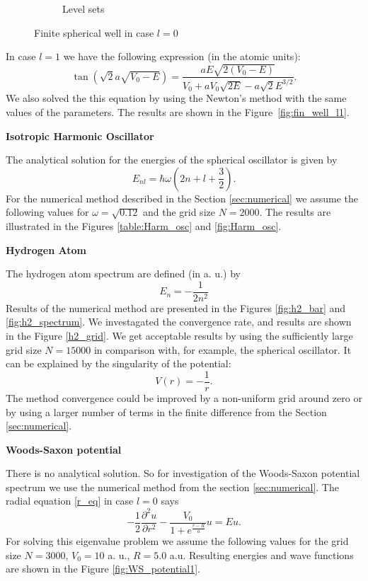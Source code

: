 \documentclass[a4paper, 11pt]{article}
\begin{document}
\begin{figure}[h!]
\begin{subfigure}{.5\textwidth}
  \caption{Level sets}
  \label{fig:wave_func}
\end{subfigure}
\caption{Finite spherical well in case $l=0$}
\label{fig:WS_potential}
\end{figure}

In case $l=1$ we have the following expression (in the atomic units):
$$\tan(\sqrt{2} a \sqrt{V_0-E}) = \frac{a E \sqrt{2(V_0 - E)}}{V_0+a V_0 \sqrt{2E} -a \sqrt{2} E^{3/2}}.$$
We also solved the this equation by using the Newton's method with the same values of the parameters. The results are shown in the Figure~\ref{fig:fin_well_l1}.

\begin{center}
		\large
		\textbf{Isotropic Harmonic Oscillator}		\\[0.5 cm]
\end{center}
The analytical solution for the energies of the spherical oscillator is given by
$$E_{nl} = \hbar \omega (2 n +l+\frac{3}{2}).$$
For the numerical method described in the Section \ref{sec:numerical} we assume the following values for $\omega = \sqrt{0.12}$ and the grid size $N = 2000.$ The results are illustrated in the Figures \ref{table:Harm_osc} and \ref{fig:Harm_osc}.

\begin{center}
		\large
		\textbf{Hydrogen Atom}		\\[0.5 cm]
\end{center}
The hydrogen atom spectrum are defined (in a. u.) by 
$$E_n = -\frac{1}{2 n^2}$$
Results of the numerical method are presented in the Figures \ref{fig:h2_bar} and \ref{fig:h2_spectrum}. We investagated the convergence rate, and results are shown in the Figure \ref{h2_grid}.
We get acceptable results by using the sufficiently large grid size $N = 15000$ in comparison with, for example, the spherical oscillator. It can be explained by the singularity of the potential:
$$V(r) = -\frac{1}{r}.$$
The method convergence could be improved by a non-uniform grid around zero or by using a larger number of terms in the finite difference from the Section \ref{sec:numerical}.

\begin{center}
		\large
		\textbf{Woods-Saxon potential}		\\[0.5 cm]
\end{center}
There is no analytical solution. So for investigation of the Woods-Saxon potential spectrum we use the numerical method from the section \ref{sec:numerical}. The radial equation \eqref{r_eq} in case $l=0$ says 
$$-\frac{1}{2}\frac{\partial^2 u}{\partial r^2 }- \frac{V_0}{1+e^\frac{r-R}{a}}u = Eu.$$
For solving this eigenvalue problem we assume the following values for the grid size $N = 3000$,  $V_0 = 10$ a. u., $R = 5.0$ a.u. Resulting energies and wave functions are shown in the Figure \ref{fig:WS_potential1}.
\end{document}
